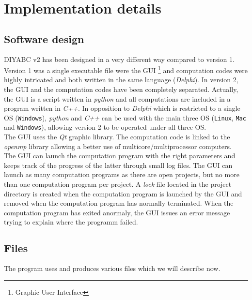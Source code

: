 \clearpage
\section{Implementation details}
\subsection{Software design}
DIYABC v2 has been designed in a very different way compared to version 1. Version 1 was a single executable file were the GUI \footnote{Graphic User Interface} and computation codes were highly intricated and both written in the same language (\emph{Delphi}). In version 2, the GUI and the computation codes have been completely separated. Actually, the GUI is a script written in \emph{python} and all computations are included in a program written in \emph{C++}. In opposition to \emph{Delphi} which is restricted to a single OS (\texttt{Windows}), \textit{python} and \textit{C++} can be used with the main three OS (\texttt{Linux}, \texttt{Mac} and \texttt{Windows}), allowing version 2  to be operated under all three OS.\\
The GUI uses the \textit{Qt} graphic library. The computation code is linked to the \textit{openmp} library allowing a better use of multicore/multiprocessor computers.\\
The GUI can launch the computation program with the right parameters and keeps track of the progress of the latter through small log files. The GUI can launch as many computation programs as there are open projects, but no more than one computation program per project. A \textit{lock} file located in the project directory is created when the computation program is launched by the GUI and removed when the computation program has normally terminated. When the computation program has exited anormaly, the GUI issues an error message trying to explain where the programm failed.    
\subsection{Files}
The program uses and produces various files which we will describe now.
